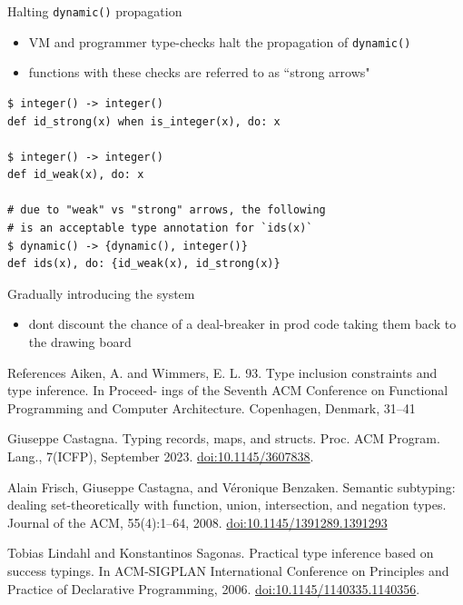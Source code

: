 \documentclass[
  ignorenonframetext,
  aspectratio=169]{beamer}
\newcommand{\passthrough}[1]{#1}
\providecommand{\tightlist}{%
  \setlength{\itemsep}{0pt}\setlength{\parskip}{0pt}}
\begin{document}
\begin{frame}[fragile]{Halting \passthrough{\lstinline!dynamic()!}
propagation}
\label{halting-dynamic-propagation}
\begin{itemize}
\tightlist
\item
  VM and programmer type-checks halt the propagation of
  \passthrough{\lstinline!dynamic()!}
\item
  functions with these checks are referred to as ``strong arrows"
\end{itemize}

\begin{lstlisting}
$ integer() -> integer()
def id_strong(x) when is_integer(x), do: x

$ integer() -> integer()
def id_weak(x), do: x

# due to "weak" vs "strong" arrows, the following
# is an acceptable type annotation for `ids(x)`
$ dynamic() -> {dynamic(), integer()}
def ids(x), do: {id_weak(x), id_strong(x)}
\end{lstlisting}
\end{frame}

\begin{frame}{Gradually introducing the system}
\label{gradually-introducing-the-system}
\begin{itemize}
\tightlist
\item
  don\textquotesingle t discount the chance of a deal-breaker in prod
  code taking them back to the drawing board
\end{itemize}
\end{frame}

\begin{frame}{References}
\label{references}
Aiken, A. and Wimmers, E. L. 93. Type inclusion constraints and type
inference. In Proceed- ings of the Seventh ACM Conference on Functional
Programming and Computer Architecture. Copenhagen, Denmark, 31--41

Giuseppe Castagna. Typing records, maps, and structs. Proc. ACM Program.
Lang., 7(ICFP), September 2023. \url{doi:10.1145/3607838}.

Alain Frisch, Giuseppe Castagna, and Véronique Benzaken. Semantic
subtyping: dealing set-theoretically with function, union, intersection,
and negation types. Journal of the ACM, 55(4):1--64, 2008.
\url{doi:10.1145/1391289.1391293}

Tobias Lindahl and Konstantinos Sagonas. Practical type inference based
on success typings. In ACM-SIGPLAN International Conference on
Principles and Practice of Declarative Programming, 2006.
\url{doi:10.1145/1140335.1140356}.
\end{frame}
\end{document}
